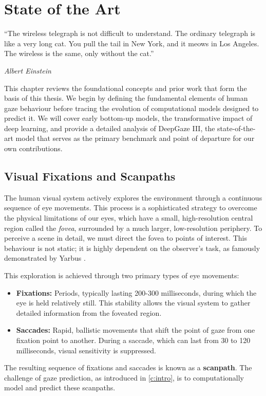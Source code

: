 \chapter{State of the Art}
\label{c:sota}

\epigraph{\enquote{The wireless telegraph is not difficult to understand. The ordinary telegraph is like a very long cat. You pull the tail in New York, and it meows in Los Angeles. The wireless is the same, only without the cat.}}{\emph{Albert Einstein}}

This chapter reviews the foundational concepts and prior work that form the basis of this thesis. We begin by defining the fundamental elements of human gaze behaviour before tracing the evolution of computational models designed to predict it. We will cover early bottom-up models, the transformative impact of deep learning, and provide a detailed analysis of DeepGaze III, the state-of-the-art model that serves as the primary benchmark and point of departure for our own contributions.

\section{Visual Fixations and Scanpaths}
\label{sec:sota_fixations}

The human visual system actively explores the environment through a continuous sequence of eye movements. This process is a sophisticated strategy to overcome the physical limitations of our eyes, which have a small, high-resolution central region called the \emph{fovea}, surrounded by a much larger, low-resolution periphery. To perceive a scene in detail, we must direct the fovea to points of interest. This behaviour is not static; it is highly dependent on the observer's task, as famously demonstrated by Yarbus \cite{yarbus1967eye}.

This exploration is achieved through two primary types of eye movements:
\begin{itemize}
    \item \textbf{Fixations:} Periods, typically lasting 200-300 milliseconds, during which the eye is held relatively still. This stability allows the visual system to gather detailed information from the foveated region.
    \item \textbf{Saccades:} Rapid, ballistic movements that shift the point of gaze from one fixation point to another. During a saccade, which can last from 30 to 120 milliseconds, visual sensitivity is suppressed.
\end{itemize}
The resulting sequence of fixations and saccades is known as a \textbf{scanpath}. The challenge of gaze prediction, as introduced in \cref{c:intro}, is to computationally model and predict these scanpaths.

